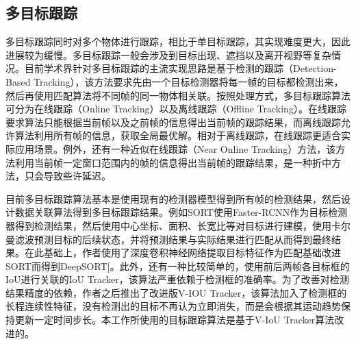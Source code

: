 \subsection{多目标跟踪}
\label{mot}
多目标跟踪同时对多个物体进行跟踪，相比于单目标跟踪，其实现难度更大，因此进展较为缓慢。多目标跟踪一般会涉及到目标出现、遮挡以及离开视野等复杂情况。目前学术界针对多目标跟踪的主流实现思路是基于检测的跟踪（Detection-Based Tracking），该方法要求先由一个目标检测器将每一帧的目标都检测出来，然后再使用匹配算法将不同帧的同一物体相关联。按照处理方式，多目标跟踪算法可分为在线跟踪（Online Tracking）以及离线跟踪（Offline Tracking）。在线跟踪要求算法只能根据当前帧以及之前帧的信息得出当前帧的跟踪结果，而离线跟踪允许算法利用所有帧的信息，获取全局最优解。相对于离线跟踪，在线跟踪更适合实际应用场景。例外，还有一种近似在线跟踪（Near Online Tracking）方法，该方法利用当前帧一定窗口范围内的帧的信息得出当前帧的跟踪结果，是一种折中方法，只会导致些许延迟。

目前多目标跟踪算法基本是使用现有的检测器模型得到所有帧的检测结果，然后设计数据关联算法得到多目标跟踪结果。例如SORT\cite{bewley2016simple}使用Faster-RCNN作为目标检测器得到检测结果，然后使用中心坐标、面积、长宽比等对目标进行建模，使用卡尔曼滤波预测目标的后续状态，并将预测结果与实际结果进行匹配从而得到最终结果。在此基础上，作者使用了深度卷积神经网络提取目标特征作为匹配基础改进SORT而得到DeepSORT[\cite{wojke2017simple}。此外，还有一种比较简单的，使用前后两帧各目标框的IoU进行关联的IoU Tracker\cite{bochinski2017high}，该算法严重依赖于检测框的准确率。为了改善对检测结果精度的依赖，作者之后推出了改进版V-IOU Tracker\cite{bochinski2018extending}，该算法加入了检测框的长程连续性特征，没有检测出的目标不再认为立即消失，而是会根据其运动趋势保持更新一定时间步长。本工作所使用的目标跟踪算法是基于V-IoU Tracker算法改进的。

